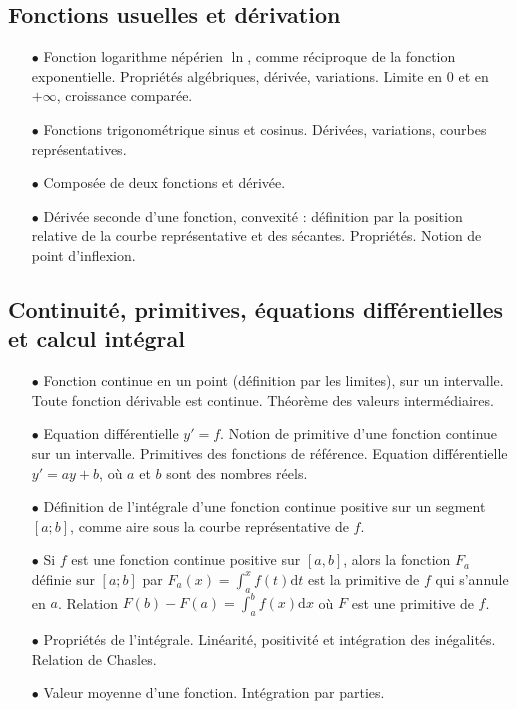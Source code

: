 \documentclass[french,bookmarks]{article}
\begin{document}
    \subsection*{Fonctions usuelles et dérivation}
    
    \begin{enumerate}
        \item[$\bullet$] Fonction logarithme népérien $\ln$, comme réciproque de la fonction exponentielle. Propriétés algébriques, dérivée, variations. Limite en $0$ et en $+\infty$, croissance comparée.
        
        \item[$\bullet$] Fonctions trigonométrique sinus et cosinus. Dérivées, variations, courbes représentatives.
        
        \item[$\bullet$] Composée de deux fonctions et dérivée.
        
        \item[$\bullet$] Dérivée seconde d'une fonction, convexité : définition par la position relative de la courbe représentative et des sécantes. Propriétés. Notion de point d'inflexion.
    \end{enumerate}
    
    \subsection*{Continuité, primitives, équations différentielles et calcul intégral}
    
    \begin{enumerate}
        \item[$\bullet$] Fonction continue en un point (définition par les limites), sur un intervalle. Toute fonction dérivable est continue. Théorème des valeurs intermédiaires.
        
        \item[$\bullet$] Equation différentielle $y' = f$. Notion de primitive d'une fonction continue sur un intervalle. Primitives des fonctions de référence. Equation différentielle $y' = ay + b$, où $a$ et $b$ sont des nombres réels.
        
        \item[$\bullet$] Définition de l'intégrale d'une fonction continue positive sur un segment $[a; b]$, comme aire sous la courbe représentative de $f$. 
        
        \item[$\bullet$] Si $f$ est une fonction continue positive sur $[a, b]$, alors la fonction $F_a$ définie sur $[a; b]$ par $F_a(x) = \displaystyle \int_a^x f(t)\textrm{d}t$ est la primitive de $f$ qui s'annule en $a$. Relation $F(b) - F(a) = \displaystyle\int_a^b f(x)\textrm{d}x$ où $F$ est une primitive de $f$.
            
        \item[$\bullet$] Propriétés de l'intégrale. Linéarité, positivité et intégration des inégalités. Relation de Chasles.
        
        \item[$\bullet$] Valeur moyenne d'une fonction. Intégration par parties.
    \end{enumerate}
    
\end{document}

